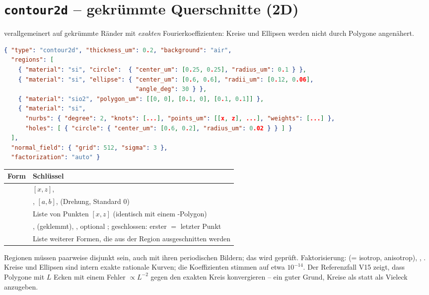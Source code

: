 \section{\texttt{contour2d} -- gekrümmte Querschnitte (2D)}\label{sec:contour2d}
%
 verallgemeinert  auf gekrümmte Ränder mit \emph{exakten} Fourierkoeffizienten:
Kreise und Ellipsen werden nicht durch Polygone angenähert.
\begin{lstlisting}[language=json]
{ "type": "contour2d", "thickness_um": 0.2, "background": "air",
  "regions": [
    { "material": "si", "circle":  { "center_um": [0.25, 0.25], "radius_um": 0.1 } },
    { "material": "si", "ellipse": { "center_um": [0.6, 0.6], "radii_um": [0.12, 0.06],
                                     "angle_deg": 30 } },
    { "material": "sio2", "polygon_um": [[0, 0], [0.1, 0], [0.1, 0.1]] },
    { "material": "si",
      "nurbs": { "degree": 2, "knots": [...], "points_um": [[x, z], ...], "weights": [...] },
      "holes": [ { "circle": { "center_um": [0.6, 0.2], "radius_um": 0.02 } } ] }
  ],
  "normal_field": { "grid": 512, "sigma": 3 },
  "factorization": "auto" }
\end{lstlisting}
\begin{center}
\small
\begin{tabularx}{\linewidth}{lY}
\toprule
Form & Schlüssel \\
\midrule
{} &  $[x,z]$,  \\
 & ,  $[a,b]$,  (Drehung, Standard 0) \\
 & Liste von Punkten $[x,z]$ (identisch mit einem -Polygon) \\
 & ,  (geklemmt), , optional ; geschlossen: erster
$=$ letzter Punkt \\
 & Liste weiterer Formen, die aus der Region ausgeschnitten werden \\
\bottomrule
\end{tabularx}
\end{center}
Regionen müssen paarweise disjunkt sein, auch mit ihren periodischen Bildern; das wird geprüft. Faktorisierung:
 (=  isotrop,  anisotrop), , . Kreise und Ellipsen sind
intern exakte rationale Kurven; die Koeffizienten stimmen auf etwa $10^{-14}$. Der Referenzfall V15 zeigt, dass
Polygone mit $L$ Ecken mit einem Fehler $\propto L^{-2}$ gegen den exakten Kreis konvergieren -- ein guter Grund,
Kreise als  statt als Vieleck anzugeben.

